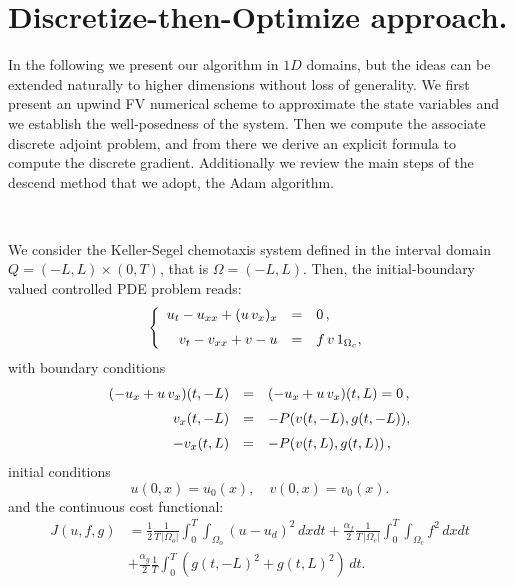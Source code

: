 \documentclass[11pt]{article}
\def \hueco{\noalign{\medskip}}
\def \beq{\begin{equation}}
\def \eeq{\end{equation}}
\def \ba{\begin{array}}
\def \ea{\end{array}}
\numberwithin{theorem}{section}
\begin{document}
%
%

\section{Discretize-then-Optimize approach.}\label{sec:DiscOpt}

In the following we present our algorithm in $1D$ domains, but the ideas can be extended naturally to higher dimensions without loss of generality. We first present an upwind FV numerical scheme  to approximate the state variables and we establish the well-posedness of the system. Then we compute the associate discrete adjoint problem, and from there we derive an explicit formula to compute the discrete gradient. Additionally we review the main steps of the descend method that we adopt, the  Adam algorithm.

\

We consider the Keller-Segel chemotaxis system defined in the interval domain $Q=(-L,L)\times (0,T)$, that is $\Omega=(-L,L)$. Then, the initial-boundary valued controlled PDE problem reads:
\beq\label{origsys}
\left\{\ba{rcl}
u_t- u_{xx}+(u \,v_x)_x
&=&
0\,,
\\ \hueco
v_t-  v_{xx}+ v-u
&=&f\,v\, 1_{\Omega_c}, 
\ea\right.
\eeq
with boundary conditions
$$
\ba{rcl}
(- u_x+u \,v_x)(t,-L)
&=&
(- u_x+u \,v_x)(t,L)
=
0\,,
\\ \hueco
v_x(t,-L)
&=&
-P(v(t,-L),g(t,-L)),
\\ \hueco
- v_x(t,L)
&=&
-P(v(t,L),g(t,L))\,,
\ea
$$
initial conditions
$$
u(0,x)=u_0(x), \quad v(0,x)=v_0(x).
$$
and the continuous cost functional:
\begin{align*}
    J(u,f,g)&=\frac{1}{2} \frac{1}{T\, |\Omega_o|}\int_0^T\!\!\int_{\Omega_o}(u-u_d)^2  \, dx dt
    +\frac{\alpha_f}{2} \frac{1}{T\, |\Omega_c|}\int_0^T\!\!\int_{\Omega_c} f^2   \, dx dt\\
    & +\frac{\alpha_g}{2} \frac{1}{T} \int_0^T \left(g(t,-L)^2+g(t,L)^2\right)  \, dt. 
\end{align*}
\end{document}
